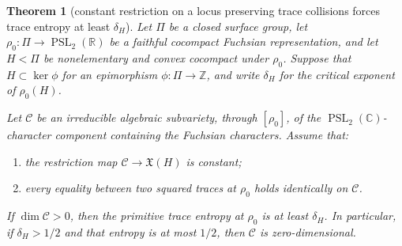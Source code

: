 \documentclass[11pt,reqno]{amsart}
\newtheorem{theorem}{Theorem}[section]
\theoremstyle{definition}
\theoremstyle{remark}
\newcommand{\R}{\mathbb R}
\newcommand{\C}{\mathbb C}
\newcommand{\Z}{\mathbb Z}
\newcommand{\PSL}{\operatorname{PSL}}
\begin{document}
\begin{theorem}[constant restriction on a locus preserving trace collisions forces trace entropy at least \(\delta_H\)]
\label{thm:relative-fiber-rigidity}
Let \(\Pi\) be a closed surface group, let
\(\rho_0\colon\Pi\to\PSL_2(\R)\) be a faithful cocompact Fuchsian
representation, and let \(H<\Pi\) be nonelementary and convex cocompact
under \(\rho_0\).  Suppose that \(H\subset\ker\phi\) for an epimorphism
\(\phi\colon\Pi\to\Z\), and write \(\delta_H\) for the critical exponent of
\(\rho_0(H)\).

Let \(\mathcal C\) be an irreducible algebraic subvariety, through
\([\rho_0]\), of the \(\PSL_2(\C)\)-character component containing
the Fuchsian characters.  Assume that:
\begin{enumerate}[label=\textup{(\alph*)}]
\item the restriction map \(\mathcal C\to\mathfrak X(H)\) is constant;
\item every equality between two squared traces at \(\rho_0\) holds
identically on \(\mathcal C\).
\end{enumerate}
If \(\dim\mathcal C>0\), then the primitive trace entropy at \(\rho_0\)
is at least \(\delta_H\).  In particular, if
\(\delta_H>1/2\) and that entropy is at most \(1/2\), then
\(\mathcal C\) is zero-dimensional.
\end{theorem}
\end{document}

